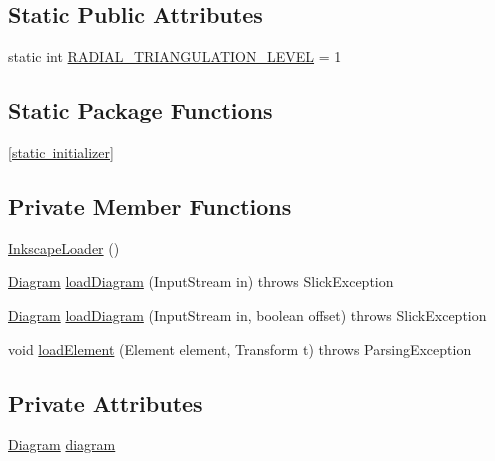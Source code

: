 \subsection*{Static Public Attributes}
\begin{DoxyCompactItemize}
\item 
static int \mbox{\hyperlink{classorg_1_1newdawn_1_1slick_1_1svg_1_1_inkscape_loader_a5cc77f97fe0ecb80c32c1575c9e28ad6}{R\+A\+D\+I\+A\+L\+\_\+\+T\+R\+I\+A\+N\+G\+U\+L\+A\+T\+I\+O\+N\+\_\+\+L\+E\+V\+EL}} = 1
\end{DoxyCompactItemize}
\subsection*{Static Package Functions}
\begin{DoxyCompactItemize}
\item 
\mbox{\hyperlink{classorg_1_1newdawn_1_1slick_1_1svg_1_1_inkscape_loader_a637c0d9aa9427845cf2892aab26350d9}{\mbox{[}static initializer\mbox{]}}}
\end{DoxyCompactItemize}
\subsection*{Private Member Functions}
\begin{DoxyCompactItemize}
\item 
\mbox{\hyperlink{classorg_1_1newdawn_1_1slick_1_1svg_1_1_inkscape_loader_a02b783a62cfaf619034970a97679625a}{Inkscape\+Loader}} ()
\item 
\mbox{\hyperlink{classorg_1_1newdawn_1_1slick_1_1svg_1_1_diagram}{Diagram}} \mbox{\hyperlink{classorg_1_1newdawn_1_1slick_1_1svg_1_1_inkscape_loader_ad879b916430c92222760073b23ff6a16}{load\+Diagram}} (Input\+Stream in)  throws Slick\+Exception 
\item 
\mbox{\hyperlink{classorg_1_1newdawn_1_1slick_1_1svg_1_1_diagram}{Diagram}} \mbox{\hyperlink{classorg_1_1newdawn_1_1slick_1_1svg_1_1_inkscape_loader_a726fc91c4d5180c8e1005dd0e0c519e8}{load\+Diagram}} (Input\+Stream in, boolean offset)  throws Slick\+Exception 
\item 
void \mbox{\hyperlink{classorg_1_1newdawn_1_1slick_1_1svg_1_1_inkscape_loader_a003d181b8ad2fe05d1a9203ec11faea6}{load\+Element}} (Element element, Transform t)  throws Parsing\+Exception 
\end{DoxyCompactItemize}
\subsection*{Private Attributes}
\begin{DoxyCompactItemize}
\item 
\mbox{\hyperlink{classorg_1_1newdawn_1_1slick_1_1svg_1_1_diagram}{Diagram}} \mbox{\hyperlink{classorg_1_1newdawn_1_1slick_1_1svg_1_1_inkscape_loader_a42085121425f35e4e3be17052cf39dbc}{diagram}}
\end{DoxyCompactItemize}
